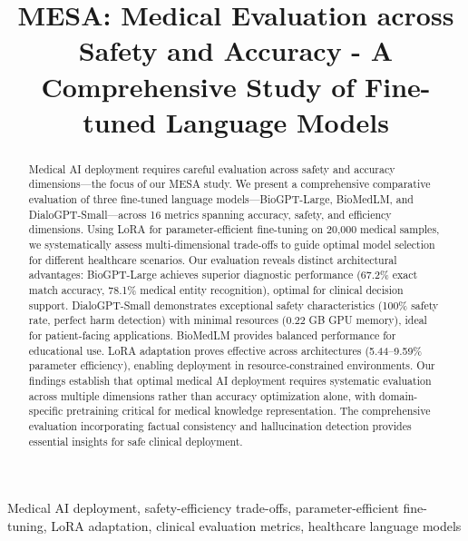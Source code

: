 \documentclass[conference]{IEEEtran}
\begin{document}
\title{MESA: Medical Evaluation across Safety and Accuracy - A Comprehensive Study of Fine-tuned Language Models}

\author{
}

\maketitle

\begin{abstract}
Medical AI deployment requires careful evaluation across safety and accuracy dimensions—the focus of our MESA study. We present a comprehensive comparative evaluation of three fine-tuned language models---BioGPT-Large, BioMedLM, and DialoGPT-Small---across 16 metrics spanning accuracy, safety, and efficiency dimensions. Using LoRA for parameter-efficient fine-tuning on 20,000 medical samples, we systematically assess multi-dimensional trade-offs to guide optimal model selection for different healthcare scenarios. Our evaluation reveals distinct architectural advantages: BioGPT-Large achieves superior diagnostic performance (67.2\% exact match accuracy, 78.1\% medical entity recognition), optimal for clinical decision support. DialoGPT-Small demonstrates exceptional safety characteristics (100\% safety rate, perfect harm detection) with minimal resources (0.22 GB GPU memory), ideal for patient-facing applications. BioMedLM provides balanced performance for educational use. LoRA adaptation proves effective across architectures (5.44--9.59\% parameter efficiency), enabling deployment in resource-constrained environments. Our findings establish that optimal medical AI deployment requires systematic evaluation across multiple dimensions rather than accuracy optimization alone, with domain-specific pretraining critical for medical knowledge representation. The comprehensive evaluation incorporating factual consistency and hallucination detection provides essential insights for safe clinical deployment.
\end{abstract}

\begin{IEEEkeywords}
Medical AI deployment, safety-efficiency trade-offs, parameter-efficient fine-tuning, LoRA adaptation, clinical evaluation metrics, healthcare language models
\end{IEEEkeywords}
\end{document}
